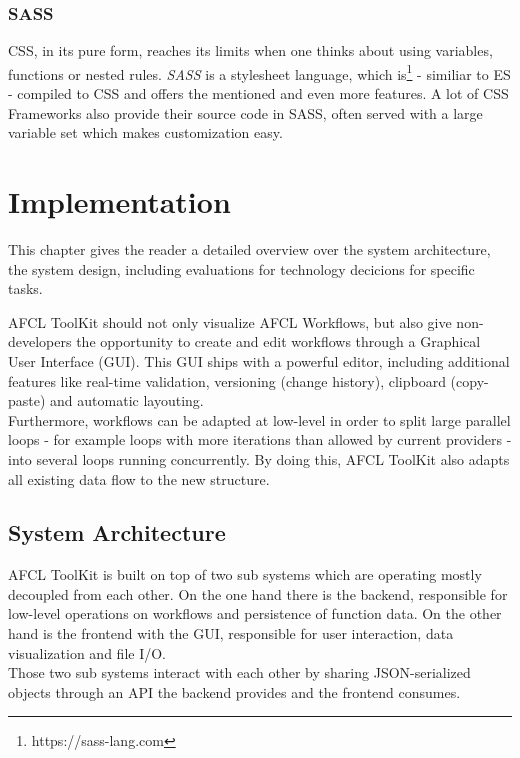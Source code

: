 \documentclass[a4paper,top=25mm,bottom=25mm,12pt,pdftex,halfparskip,twoside,bibtotoc,numbers=noenddot]{scrbook}
\begin{document}
\subsection{SASS}

CSS, in its pure form, reaches its limits when one thinks about using variables, functions or nested rules. \textit{SASS} is a stylesheet language, which is\footnote{https://sass-lang.com} - similiar to ES - compiled to CSS and offers the mentioned and even more features.
A lot of CSS Frameworks also provide their source code in SASS, often served with a large variable set which makes customization easy.

\chapter{Implementation}

This chapter gives the reader a detailed overview over the system architecture, the system design, including evaluations for technology decicions for specific tasks.

AFCL ToolKit should not only visualize AFCL Workflows, but also give non-developers the opportunity to create and edit workflows through a Graphical User Interface (GUI). This GUI ships with a powerful editor, including additional features like real-time validation, versioning (change history), clipboard (copy-paste) and automatic layouting.\\
Furthermore, workflows can be adapted at low-level in order to split large parallel loops - for example loops with more iterations than allowed by current providers - into several loops running concurrently. By doing this, AFCL ToolKit also adapts  all existing data flow to the new structure.

\section{System Architecture}



AFCL ToolKit is built on top of two sub systems which are operating mostly decoupled from each other. On the one hand there is the backend, responsible for low-level operations on workflows and persistence of function data. On the other hand is the frontend with the GUI, responsible for user interaction, data visualization and file I/O.\\
Those two sub systems interact with each other by sharing JSON-serialized objects through an API the backend provides and the frontend consumes.
\end{document}
